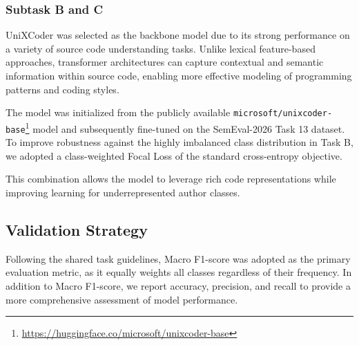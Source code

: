 \documentclass[11pt]{article}
\begin{document}
\subsubsection{ Subtask B and C}

UniXCoder \cite{guo2022unixcoderunifiedcrossmodalpretraining} was selected as the backbone model due to its strong performance on a variety of source code understanding tasks. Unlike lexical feature-based approaches, transformer architectures can capture contextual and semantic information within source code, enabling more effective modeling of programming patterns and coding styles.

The model was initialized from the publicly available \texttt{microsoft/unixcoder-base}\footnote{\url{https://huggingface.co/microsoft/unixcoder-base}} model and subsequently fine-tuned on the SemEval-2026 Task 13 dataset. To improve robustness against the highly imbalanced class distribution in Task B, we adopted a class-weighted Focal Loss \cite{lin2018focallossdenseobject} of the standard cross-entropy objective.

This combination allows the model to leverage rich code representations while improving learning for underrepresented author classes.

\subsection{Validation Strategy}
Following the shared task guidelines, Macro F1-score was adopted as the primary evaluation metric, as it equally weights all classes regardless of their frequency. In addition to Macro F1-score, we report accuracy, precision, and recall to provide a more comprehensive assessment of model performance.
\end{document}
